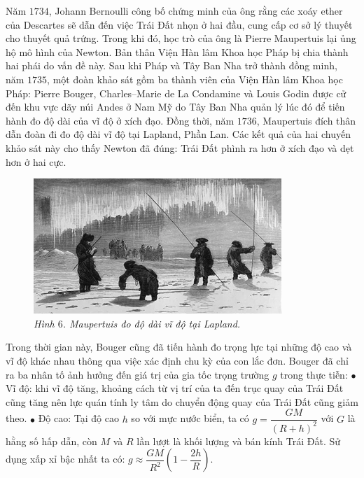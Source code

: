 \begin{multicols}{2}
\begin{figure}[H]
	\end{figure}
	Năm $1734$, Johann Bernoulli công bố chứng minh của ông rằng các xoáy ether của Descartes sẽ dẫn đến việc Trái Đất nhọn ở hai đầu, cung cấp cơ sở lý thuyết cho thuyết quả trứng. Trong khi đó, học trò của ông là Pierre Maupertuis lại ủng hộ mô hình của Newton. Bản thân Viện Hàn lâm Khoa học Pháp bị chia thành hai phái do vấn đề này.
	\vskip 0.1cm
	Sau khi Pháp và Tây Ban Nha trở thành đồng minh, năm $1735$, một đoàn khảo sát gồm ba thành viên của Viện Hàn lâm Khoa học Pháp: Pierre Bouger, Charles--Marie de La Condamine và Louis Godin được cử đến khu vực dãy núi Andes ở Nam Mỹ do Tây Ban Nha quản lý lúc đó để tiến hành đo độ dài của vĩ độ ở xích đạo. Đồng thời, năm $1736$, Maupertuis đích thân dẫn đoàn đi đo độ dài vĩ độ tại Lapland, Phần Lan. Các kết quả của hai chuyến khảo sát này cho thấy Newton đã đúng: Trái Đất phình ra hơn ở xích đạo và dẹt hơn ở hai cực.
	\begin{figure}[H]
		\vspace*{-5pt}
		\centering
		\captionsetup{labelformat= empty, justification=centering}
		\includegraphics[width =1\linewidth]{6}
		\caption{\small\textit{\color{timhieukhoahoc}Hình $6$. Maupertuis đo độ dài vĩ độ tại Lapland.}}
		\vspace*{-10pt}
	\end{figure}
	Trong thời gian này, Bouger cũng đã tiến hành đo trọng lực tại những độ cao và vĩ độ khác nhau thông qua việc xác định chu kỳ của con lắc đơn. Bouger đã chỉ ra ba nhân tố ảnh hưởng đến giá trị của gia tốc trọng trường $g$ trong thực tiễn:
	\vskip 0.1cm
	$\bullet$ Vĩ độ: khi vĩ độ tăng, khoảng cách từ vị trí của ta đến trục quay của Trái Đất cũng tăng nên lực quán tính ly tâm do chuyển động quay của Trái Đất cũng giảm theo.
	\vskip 0.1cm
	$\bullet$ Độ cao: Tại độ cao $h$ so với mực nước biển, ta có $g = \dfrac{GM}{(R +h)^2}$ với $G$ là hằng số hấp dẫn, còn $M$ và $R$ lần lượt là khối lượng và bán kính Trái Đất. Sử dụng xấp xỉ bậc nhất ta có: $g \approx \dfrac{GM}{R^2}\left(1 - \dfrac{2h}{R}\right)$.

\end{multicols}
